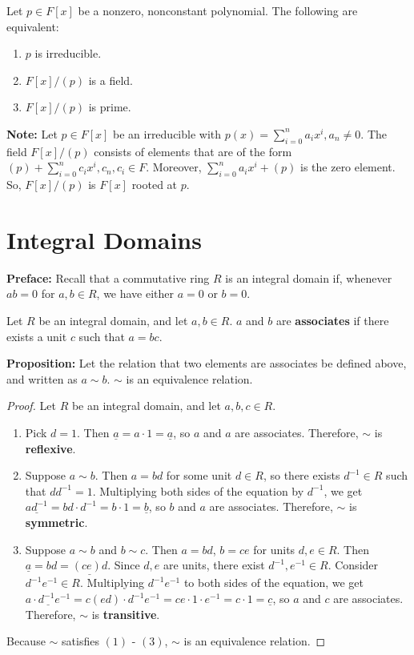 \documentclass [12pt] {article}
\newenvironment{definition}[1]{\begin{tcolorbox}[title={Definition: #1},colback=blue!5!white,colframe=black!75!blue]}{\end{tcolorbox}}
\newenvironment{corollary}[1]{\begin{tcolorbox}[title={Corollary #1}]}{\end{tcolorbox}}
\renewcommand{\bf}[1]{\textbf{{#1}}}
\newcommand{\ul}[1]{\underline{{#1}}}
\begin{document}
\begin{corollary}{}
    Let $p \in F[x]$ be a nonzero, nonconstant polynomial. The following are equivalent:
    \begin{enumerate}[label=(\arabic*)]
        \item $p$ is irreducible.
        \item $F[x]/(p)$ is a field.
        \item $F[x]/(p)$ is prime.
    \end{enumerate}
\end{corollary}
\bf{Note:} Let $p \in F[x]$ be an irreducible with
$p(x) = \sum\limits_{i = 0}^{n} a_i x^i, a_n \neq 0$. The field $F[x]/(p)$ consists of elements that
are of the form $(p) + \sum\limits_{i = 0}^{n} c_i x^i, c_n, c_i \in F$. Moreover,
$\sum\limits_{i = 0}^{n} a_i x^i + (p)$ is the zero element. So, $F[x]/(p)$ is $F[x]$ rooted at $p$.

\newpage
\section{Integral Domains}
\bf{Preface:} Recall that a commutative ring $R$ is an integral domain if, whenever $ab = 0$ for
$a, b \in R$, we have either $a = 0$ or $b = 0$.

\begin{definition}{Associate (Integral Domains)}
    Let $R$ be an integral domain, and let $a, b \in R$. $a$ and $b$ are \bf{associates} if there
    exists a unit $c$ such that $a = bc$.
\end{definition}
\bf{Proposition:} Let the relation that two elements are associates be defined above, and written as
$a \sim b$. $\sim$ is an equivalence relation.
\begin{proof}
    Let $R$ be an integral domain, and let $a, b, c \in R$.
    \begin{enumerate}[label=(\arabic*)]
        \item Pick $d = 1$. Then $\ul{a} = a \cdot 1 = \ul{a}$, so $a$ and $a$ are associates. Therefore,
            $\sim$ is \bf{reflexive}.
        \item Suppose $a \sim b$. Then $a = bd$ for some unit $d \in R$, so there exists
            $d^{-1} \in R$ such that $dd^{-1} = 1$. Multiplying both sides of the equation by
            $d^{-1}$, we get $\ul{ad^{-1}} = bd \cdot d^{-1} = b \cdot 1 = \ul{b}$, so $b$ and $a$
            are associates. Therefore, $\sim$ is \bf{symmetric}.
        \item Suppose $a \sim b$ and $b \sim c$. Then $a = bd$, $b = ce$ for units $d, e \in R$.
            Then $\ul{a} = bd = \ul{(ce)d}$. Since $d, e$ are units, there exist
            $d^{-1}, e^{-1} \in R$. Consider $d^{-1} e^{-1}  \in R$. Multiplying $d^{-1} e^{-1}$ to
            both sides of the equation, we get
            $\ul{a \cdot d^{-1} e^{-1}} = c(ed) \cdot d^{-1} e^{-1} = ce \cdot 1 \cdot e^{-1} = c \cdot 1 = \ul{c}$,
            so $a$ and $c$ are associates. Therefore, $\sim$ is \bf{transitive}.
    \end{enumerate}
    Because $\sim$ satisfies $(1)$ - $(3)$, $\sim$ is an equivalence relation.
\end{proof}
\end{document}

